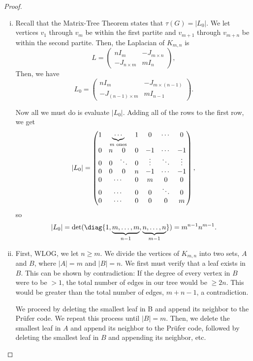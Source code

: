 \documentclass[11pt]{article}
\begin{document}
\begin{proof}
    \begin{enumerate}[(i)]
        \item Recall that the Matrix-Tree Theorem states that $\tau(G) = |L_0|$. We let vertices $v_1$ through $v_m$ be within the first partite and $v_{m+1}$ through $v_{m+n}$ be within the second partite. Then, the Laplacian of $K_{m,n}$ is \[L=\begin{pmatrix}nI_m&-J_{m \times n}\\-J_{n \times m}&mI_n\end{pmatrix},\] Then, we have
        \[
            L_0=\begin{pmatrix}nI_m&-J_{m \times (n-1)}\\-J_{(n-1) \times m}&mI_{n-1}\end{pmatrix}.
        \]

        Now all we must do is evaluate $|L_0|$. Adding all of the rows to the first row, we get
        \[
            |L_0| = \begin{pmatrix}
                1 & \multicolumn{2}{c}{\underbrace{\cdots}_{m\text{ ones}}} & 1 & 0 & \cdots & 0\\
                0 & n & 0 & 0 & -1 & \cdots & -1\\
                0 & 0 & \ddots & 0 & \vdots & \ddots & \vdots\\
                0 & 0 & 0 & n & -1 & \cdots & -1\\
                0 & \multicolumn{2}{c}{\cdots} & 0 & m & 0 & 0\\
                0 & \multicolumn{2}{c}{\cdots} & 0 & 0 & \ddots & 0\\
                0 & \multicolumn{2}{c}{\cdots} & 0 & 0 & 0 & m

            \end{pmatrix},
        \]
            so \[|L_0|=\det(\diag\{1,\underbrace{m,\dots,m}_{n-1},\underbrace{n,\dots,n}_{m-1}\})=m^{n-1}n^{m-1}.\]
        \item First, WLOG, we let $n \ge m$. We divide the vertices of $K_{m,n}$ into two sets, $A$ and $B$, where $|A|=m$ and $|B|=n$. We first must verify that a leaf exists in $B$. This can be shown by contradiction: If the degree of every vertex in $B$ were to be $> 1$, the total number of edges in our tree would be $\ge 2n$. This would be greater than the total number of edges, $m + n - 1$, a contradiction.
        
        We proceed by deleting the smallest leaf in B and append its neighbor to the Prüfer code. We repeat this process until $|B|=m$. Then, we delete the smallest leaf in $A$ and append its neighbor to the Prüfer code, followed by deleting the smallest leaf in $B$ and appending its neighbor, etc.
        

\end{enumerate}
\end{proof}
\end{document}
